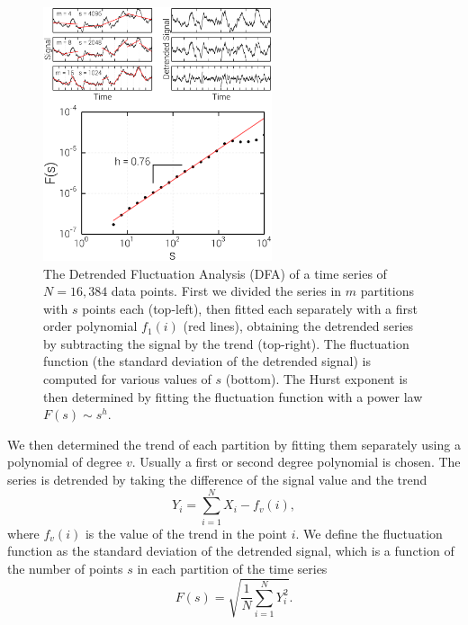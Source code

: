 \begin{figure}
    \begin{center}
        \includegraphics[width=0.6\textwidth]{chapters/ch6-asle/figs/dfa}
    \end{center}
    \caption{The Detrended Fluctuation Analysis (DFA) of a time series of
        $N=16,384$ data points. First we divided the series in $m$ partitions with
        $s$ points each (top-left), then fitted each separately with a first order
        polynomial $f_1(i)$ (red lines), obtaining the detrended series by subtracting
        the signal by the trend (top-right).  The fluctuation function (the standard
        deviation of the detrended signal) is computed for various values of $s$
        (bottom).  The Hurst exponent is then determined by fitting the fluctuation
        function with a power law $F(s)\sim s^h$.}
\label{fig:dfa}
\end{figure}

We then determined the trend of each partition by fitting them separately using
a polynomial of degree $v$. Usually a first or second degree polynomial is
chosen. The series is detrended by taking the difference of the signal value and
the trend 
\begin{equation}
    Y_i = \sum_{i=1}^{N} X_i - f_v(i),
\end{equation}
where $f_v(i)$ is the value of the trend in the point $i$. We define the fluctuation
function as the standard deviation of the detrended signal, which is a function
of the number of points $s$ in each partition of the time series
\begin{equation}
    F(s) = \sqrt{\frac{1}{N}\sum_{i=1}^{N}Y_i^2}.
\end{equation}

